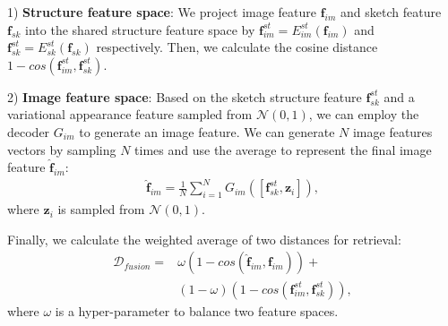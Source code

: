 \documentclass[10pt,twocolumn,letterpaper]{article}
\begin{document}
1) \textbf{Structure feature space}: We project image feature $\mathbf{f}_{im}$ and sketch feature $\mathbf{f}_{sk}$ into the shared structure feature space by $\mathbf{f}_{im}^{st}=E_{im}^{st}(\mathbf{f}_{im})$ and $\mathbf{f}_{sk}^{st}=E_{sk}^{st}(\mathbf{f}_{sk})$ respectively. Then, we calculate the cosine distance $1\!-\!cos(\mathbf{f}^{st}_{im}, \mathbf{f}^{st}_{sk})$.

2) \textbf{Image feature space}: Based on the sketch structure feature $\mathbf{f}_{sk}^{st}$ and a variational appearance feature sampled from $\mathcal{N}(0,1)$, we can employ the decoder $G_{im}$ to generate an image feature. We can generate $N$ image features vectors by sampling $N$ times and use the average to represent the final image feature $\hat{\mathbf{f}}_{im}$:
    \vspace{-5pt}
    \begin{align}
        \hat{\mathbf{f}}_{im} = \frac{1}{N}\sum_{i=1}^{N}G_{im}([\mathbf{f}_{sk}^{st}, \mathbf{z}_i]),
    \end{align}
    where $\mathbf{z}_i$ is sampled from $\mathcal{N}(0, 1)$.

Finally, we calculate the weighted average of two distances for retrieval:
\vspace{-5pt}
\begin{equation}
\begin{aligned}
    \mathcal{D}_{fusion} =& \omega (1\!-\!cos(\hat{\mathbf{f}}_{im}, \mathbf{f}_{im})) +  \\
    & (1\!-\!\omega) (1\!-\!cos(\mathbf{f}^{st}_{im}, \mathbf{f}^{st}_{sk})), 
\end{aligned}
\end{equation}
where $\omega$ is a hyper-parameter to balance two feature spaces.
\end{document}
